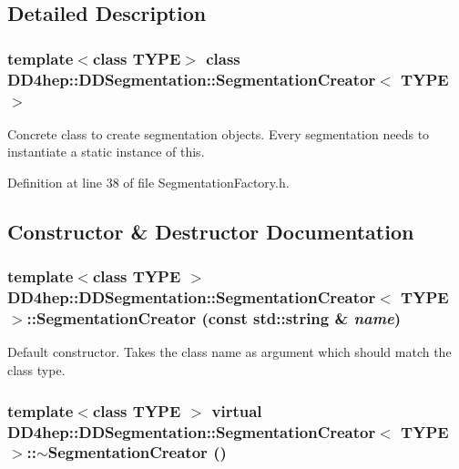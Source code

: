 \subsection{Detailed Description}
\subsubsection*{template$<$class TYPE$>$ class DD4hep::DDSegmentation::SegmentationCreator$<$ TYPE $>$}

Concrete class to create segmentation objects. Every segmentation needs to instantiate a static instance of this. 

Definition at line 38 of file SegmentationFactory.h.

\subsection{Constructor \& Destructor Documentation}
\hypertarget{class_d_d4hep_1_1_d_d_segmentation_1_1_segmentation_creator_aa260ef2741fe49696c70711f03c646cc}{
\subsubsection[{SegmentationCreator}]{\setlength{\rightskip}{0pt plus 5cm}template$<$class TYPE $>$ {\bf DD4hep::DDSegmentation::SegmentationCreator}$<$ TYPE $>$::{\bf SegmentationCreator} (const std::string \& {\em name})}}
\label{class_d_d4hep_1_1_d_d_segmentation_1_1_segmentation_creator_aa260ef2741fe49696c70711f03c646cc}


Default constructor. Takes the class name as argument which should match the class type. \hypertarget{class_d_d4hep_1_1_d_d_segmentation_1_1_segmentation_creator_abb405dd7c3a0092bfc072e8564dda6af}{
\subsubsection[{$\sim$SegmentationCreator}]{\setlength{\rightskip}{0pt plus 5cm}template$<$class TYPE $>$ virtual {\bf DD4hep::DDSegmentation::SegmentationCreator}$<$ TYPE $>$::$\sim${\bf SegmentationCreator} ()}}
\label{class_d_d4hep_1_1_d_d_segmentation_1_1_segmentation_creator_abb405dd7c3a0092bfc072e8564dda6af}


